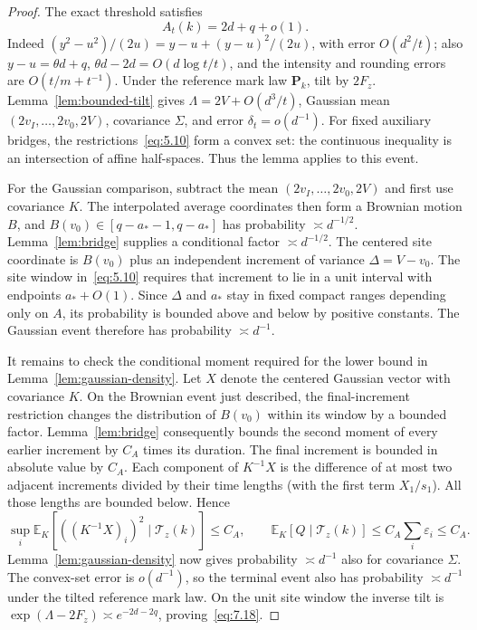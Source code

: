 \documentclass[11pt,letterpaper,reqno]{amsart}
\numberwithin{equation}{section}
\theoremstyle{remark}
\begin{document}
\begin{proof}
The exact threshold satisfies
\begin{equation}\label{eq:7.19}
A_t(k)=2d+q+o(1).
\end{equation}
Indeed $(y^2-u^2)/(2u)=y-u+(y-u)^2/(2u)$, with error $O(d^2/t)$; also
$y-u=\theta d+q$, $\theta d-2d=O(d\log t/t)$, and the intensity and rounding errors are $O(t/m+t^{-1})$.
Under the reference mark law $\mathbf P_k$, tilt by $2F_z$. Lemma~\ref{lem:bounded-tilt} gives
$\Lambda=2V+O(d^3/t)$, Gaussian mean
$(2v_I,\ldots,2v_0,2V)$, covariance $\Sigma$, and error $\delta_t=o(d^{-1})$.
For fixed auxiliary bridges, the restrictions~\eqref{eq:5.10} form a convex set: the continuous inequality is an intersection of affine half-spaces. Thus the lemma applies to this event.

For the Gaussian comparison, subtract the mean $(2v_I,\ldots,2v_0,2V)$ and first use covariance $K$. The interpolated average coordinates then form a Brownian motion $B$, and
$B(v_0)\in[q-a_*-1,q-a_*]$ has probability $\asymp d^{-1/2}$.
Lemma~\ref{lem:bridge} supplies a conditional factor $\asymp d^{-1/2}$.
The centered site coordinate is $B(v_0)$ plus an independent increment of variance
$\Delta=V-v_0$. The site window in~\eqref{eq:5.10} requires that increment to lie in a unit interval with endpoints $a_*+O(1)$. Since $\Delta$ and $a_*$ stay in fixed compact ranges depending only on $A$, its probability is bounded above and below by positive constants. The Gaussian event therefore has probability $\asymp d^{-1}$.

It remains to check the conditional moment required for the lower bound in Lemma~\ref{lem:gaussian-density}. Let $X$ denote the centered Gaussian vector with covariance $K$. On the Brownian event just described, the final-increment restriction changes the distribution of $B(v_0)$ within its window by a bounded factor. Lemma~\ref{lem:bridge} consequently bounds the second moment of every earlier increment by $C_A$ times its duration. The final increment is bounded in absolute value by $C_A$.
Each component of $K^{-1}X$ is the difference of at most two adjacent increments divided by their time lengths (with the first term $X_1/s_1$). All those lengths are bounded below. Hence
\[
\sup_i\mathbb E_K[((K^{-1}X)_i)^2\mid\mathcal T_z(k)]\le C_A,
\qquad \mathbb E_K[Q\mid\mathcal T_z(k)]\le C_A\sum_i\varepsilon_i\le C_A.
\]
Lemma~\ref{lem:gaussian-density} now gives probability $\asymp d^{-1}$ also for covariance $\Sigma$.
The convex-set error is $o(d^{-1})$, so the terminal event also has probability $\asymp d^{-1}$ under the tilted reference mark law. On the unit site window the inverse tilt is
$\exp(\Lambda-2F_z)\asymp e^{-2d-2q}$, proving~\eqref{eq:7.18}.
\end{proof}
\end{document}
